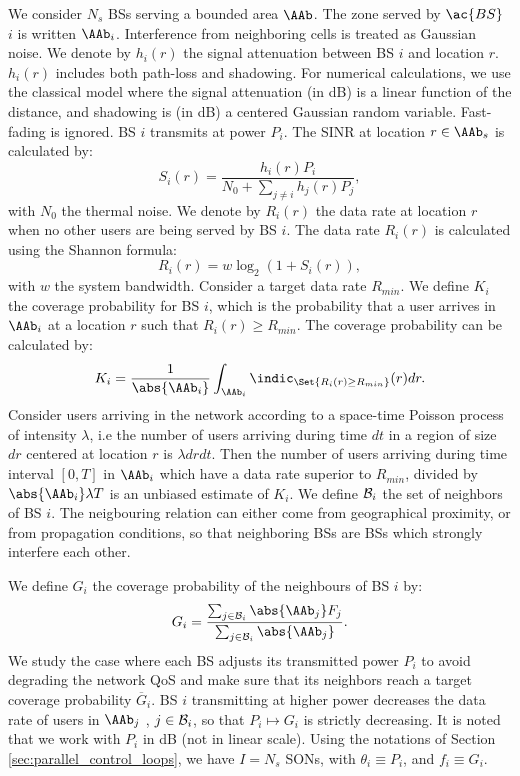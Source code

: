 \documentclass[10pt,conference,letterpaper]{IEEEtran}
\begin{document}
	We consider $N_s$ \acp{BS} serving a bounded area $\AAb$. The zone served by $\ac{BS}$ $i$ is written $\AAb_i$. Interference from neighboring cells is treated as Gaussian noise. We denote by $h_i(r)$ the signal attenuation between \ac{BS}  $i$ and location $r$. $h_i(r)$ includes both path-loss and shadowing. For numerical calculations, we use the classical model where the signal attenuation (in dB) is a linear function of the distance, and shadowing is (in dB) a centered Gaussian random variable. Fast-fading is ignored. \ac{BS} $i$ transmits at power $P_i$. The \ac{SINR} at location $r \in \AAb_s$ is calculated by:
\begin{equation}
	S_i(r) = \frac{ h_i(r) P_i }{ N_0 + \sum_{j \neq i} h_{j}(r) P_{j}},
\end{equation}
with $N_0$ the thermal noise.
	We denote by $R_i(r)$ the data rate at location $r$ when no other users are being served by \ac{BS} $i$. The data rate $R_i(r)$ is calculated using the Shannon formula:
\begin{equation}
	R_i(r) =  w \log_2(1 + S_i(r)),
\end{equation}
with $w$ the system bandwidth. Consider a target data rate $R_{min}$. We define $K_i$ the coverage probability for \ac{BS} $i$, which is the probability that a user arrives in $\AAb_i$ at a location $r$ such that $R_i(r) \geq R_{min}$. The coverage probability can be calculated by:
\begin{equation}
	K_i = \frac{1}{\abs{\AAb_i}} \int_{\AAb_i} \indic_{ \Set{ R_i(r) \geq R_{min}}  }(r)dr.
\end{equation}
	Consider users arriving in the network according to a space-time Poisson process of intensity $\lambda$, i.e the number of users arriving during time $dt$ in a region of size $dr$ centered at location $r$ is $\lambda dr dt$. Then the number of users arriving during time interval $[0 , T]$ in $\AAb_i$ which have a data rate superior to $R_{min}$, divided by $\abs{\AAb_i} \lambda T$ is an unbiased estimate of $K_i$. We define ${\cal B}_i$ the set of neighbors of \ac{BS} $i$. The neigbouring relation can either come from geographical proximity, or from propagation conditions, so that neighboring \acp{BS} are \acp{BS} which strongly interfere each other.
 	
 We define $G_i$ the coverage probability of the neighbours of \ac{BS} $i$ by:
 \begin{equation}
 G_i =  \frac{\sum_{j \in {\cal B}_i } \abs{\AAb_j} F_j}{\sum_{j \in {\cal B}_i } \abs{\AAb_j}}.  
 \end{equation}
	We study the case where each \ac{BS} adjusts its transmitted power $P_i$ to avoid degrading the network \ac{QoS} and make sure that its neighbors reach a target coverage probability $\overline{G}_i$. \ac{BS} $i$ transmitting at higher power decreases the data rate of users in $\AAb_j$ , $j \in {\cal B}_i$, so that $P_i \mapsto G_i$ is strictly decreasing. It is noted that we work with $P_i$ in dB (not in linear scale). Using the notations of Section \ref{sec:parallel_control_loops}, we have $I = N_s$ \acp{SON}, with $\theta_i \equiv P_i$, and $f_i \equiv G_i$.
	
\end{document}
